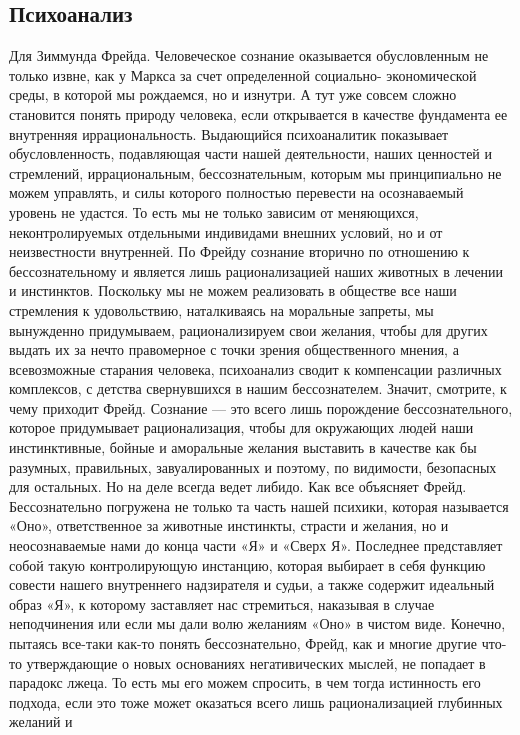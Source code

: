 \subsection{Психоанализ}
Для Зиммунда Фрейда. Человеческое сознание оказывается
обусловленным не только извне, как у Маркса за счет определенной социально-
экономической среды, в которой мы рождаемся, но и изнутри. А тут уже совсем
сложно становится понять природу человека, если открывается в качестве
фундамента ее внутренняя иррациональность. Выдающийся психоаналитик показывает
обусловленность, подавляющая части нашей деятельности, наших ценностей и
стремлений, иррациональным, бессознательным, которым мы принципиально не можем
управлять, и силы которого полностью перевести на осознаваемый уровень не
удастся. То есть мы не только зависим от меняющихся, неконтролируемых отдельными
индивидами внешних условий, но и от неизвестности внутренней. По Фрейду сознание
вторично по отношению к бессознательному и является лишь рационализацией наших
животных в лечении и инстинктов. Поскольку мы не можем реализовать в обществе
все наши стремления к удовольствию, наталкиваясь на моральные запреты, мы
вынужденно придумываем, рационализируем свои желания, чтобы для других выдать их
за нечто правомерное с точки зрения общественного мнения, а всевозможные
старания человека, психоанализ сводит к компенсации различных комплексов, с
детства свернувшихся в нашим бессознателем. Значит, смотрите, к чему приходит
Фрейд. Сознание — это всего лишь порождение бессознательного, которое
придумывает рационализация, чтобы для окружающих людей наши инстинктивные,
бойные и аморальные желания выставить в качестве как бы разумных, правильных,
завуалированных и поэтому, по видимости, безопасных для остальных. Но на деле
всегда ведет либидо. Как все объясняет Фрейд. Бессознательно погружена не только
та часть нашей психики, которая называется «Оно», ответственное за животные
инстинкты, страсти и желания, но и неосознаваемые нами до конца части «Я» и
«Сверх Я». Последнее представляет собой такую контролирующую инстанцию, которая
выбирает в себя функцию совести нашего внутреннего надзирателя и судьи, а также
содержит идеальный образ «Я», к которому заставляет нас стремиться, наказывая в
случае неподчинения или если мы дали волю желаниям «Оно» в чистом виде. Конечно,
пытаясь все-таки как-то понять бессознательно, Фрейд, как и многие другие что-то
утверждающие о новых основаниях негативических мыслей, не попадает в парадокс
лжеца. То есть мы его можем спросить, в чем тогда истинность его подхода, если
это тоже может оказаться всего лишь рационализацией глубинных желаний и
